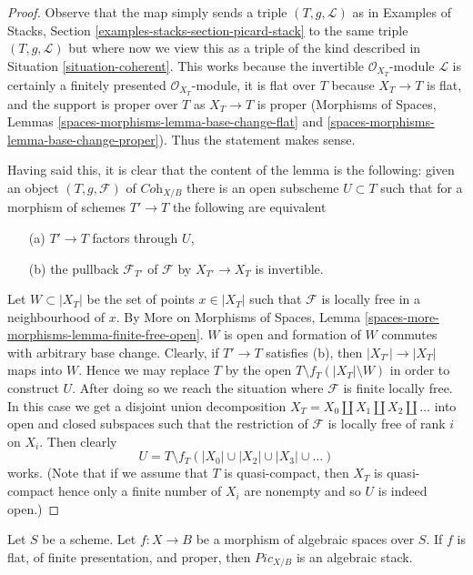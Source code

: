 \begin{proof}
Observe that the map simply sends a triple $(T, g, \mathcal{L})$
as in Examples of Stacks, Section \ref{examples-stacks-section-picard-stack}
to the same triple $(T, g, \mathcal{L})$ but where now we view
this as a triple of the kind described in
Situation \ref{situation-coherent}.
This works because the invertible $\mathcal{O}_{X_T}$-module
$\mathcal{L}$ is certainly a finitely presented $\mathcal{O}_{X_T}$-module,
it is flat over $T$ because $X_T \to T$ is flat, and the support is
proper over $T$ as $X_T \to T$ is proper
(Morphisms of Spaces, Lemmas \ref{spaces-morphisms-lemma-base-change-flat}
and \ref{spaces-morphisms-lemma-base-change-proper}).
Thus the statement makes sense.

\medskip\noindent
Having said this, it is clear that the content of the lemma is the
following: given an object $(T, g, \mathcal{F})$ of
$\textit{Coh}_{X/B}$ there is an open subscheme $U \subset T$
such that for a morphism of schemes $T' \to T$ the following
are equivalent
\begin{enumerate}
\item[(a)] $T' \to T$ factors through $U$,
\item[(b)] the pullback $\mathcal{F}_{T'}$ of
$\mathcal{F}$ by $X_{T'} \to X_T$ is invertible.
\end{enumerate}
Let $W \subset |X_T|$ be the set of points $x \in |X_T|$
such that $\mathcal{F}$ is locally free in a neighbourhood of $x$. By
More on Morphisms of Spaces, Lemma
\ref{spaces-more-morphisms-lemma-finite-free-open}.
$W$ is open and formation
of $W$ commutes with arbitrary base change.
Clearly, if $T' \to T$ satisfies (b), then $|X_{T'}| \to |X_T|$
maps into $W$. Hence we may replace $T$ by the open
$T \setminus f_T(|X_T| \setminus W)$ in order
to construct $U$. After doing so we reach the situation
where $\mathcal{F}$ is finite locally free.
In this case we get a disjoint union decomposition
$X_T = X_0 \amalg X_1 \amalg X_2 \amalg \ldots$
into open and closed subspaces such that the restriction of
$\mathcal{F}$ is locally free of rank $i$ on $X_i$. Then clearly
$$
U = T \setminus f_T(|X_0| \cup |X_2| \cup |X_3| \cup \ldots )
$$
works. (Note that if we assume that $T$ is quasi-compact, then
$X_T$ is quasi-compact hence only a finite number of $X_i$
are nonempty and so $U$ is indeed open.)
\end{proof}

\begin{proposition}
\label{proposition-pic}
Let $S$ be a scheme. Let $f : X \to B$ be a morphism of algebraic
spaces over $S$. If $f$ is flat, of finite presentation, and proper, then
$\textit{Pic}_{X/B}$ is an algebraic stack.
\end{proposition}

